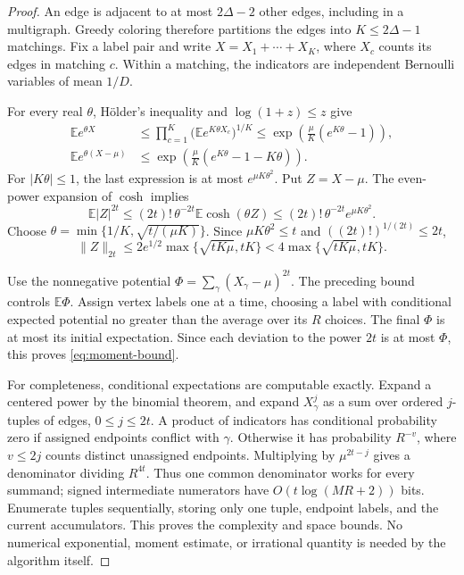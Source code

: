 \documentclass[11pt]{article}
\theoremstyle{remark}\newtheorem{remark}[theorem]{Remark}
\newcommand{\E}{\mathbb E}
\begin{document}
\begin{proof}
An edge is adjacent to at most $2\Delta-2$ other edges, including in a multigraph. Greedy coloring therefore partitions the edges into $K\le2\Delta-1$ matchings. Fix a label pair and write $X=X_1+\cdots+X_K$, where $X_c$ counts its edges in matching $c$. Within a matching, the indicators are independent Bernoulli variables of mean $1/D$.

For every real $\theta$, H\"older's inequality and $\log(1+z)\le z$ give
\begin{align*}
 \E e^{\theta X}
 &\le\prod_{c=1}^K\bigl(\E e^{K\theta X_c}\bigr)^{1/K}
 \le\exp\left(\frac\mu K(e^{K\theta}-1)\right),\\
 \E e^{\theta(X-\mu)}
 &\le\exp\left(\frac\mu K(e^{K\theta}-1-K\theta)\right).
\end{align*}
For $|K\theta|\le1$, the last expression is at most $e^{\mu K\theta^2}$. Put $Z=X-\mu$. The even-power expansion of $\cosh$ implies
\[
 \E |Z|^{2t}
 \le (2t)!\,\theta^{-2t}\E\cosh(\theta Z)
 \le (2t)!\,\theta^{-2t}e^{\mu K\theta^2}.
\]
Choose $\theta=\min\{1/K,\sqrt{t/(\mu K)}\}$. Since $\mu K\theta^2\le t$ and $((2t)!)^{1/(2t)}\le2t$,
\[
 \|Z\|_{2t}
 \le 2e^{1/2}\max\{\sqrt{tK\mu},tK\}
 <4\max\{\sqrt{tK\mu},tK\}.
\]

Use the nonnegative potential $\Phi=\sum_\gamma(X_\gamma-\mu)^{2t}$. The preceding bound controls $\E\Phi$. Assign vertex labels one at a time, choosing a label with conditional expected potential no greater than the average over its $R$ choices. The final $\Phi$ is at most its initial expectation. Since each deviation to the power $2t$ is at most $\Phi$, this proves \eqref{eq:moment-bound}.

For completeness, conditional expectations are computable exactly. Expand a centered power by the binomial theorem, and expand $X_\gamma^j$ as a sum over ordered $j$-tuples of edges, $0\le j\le2t$. A product of indicators has conditional probability zero if assigned endpoints conflict with $\gamma$. Otherwise it has probability $R^{-v}$, where $v\le2j$ counts distinct unassigned endpoints. Multiplying by $\mu^{2t-j}$ gives a denominator dividing $R^{4t}$. Thus one common denominator works for every summand; signed intermediate numerators have $O(t\log(MR+2))$ bits. Enumerate tuples sequentially, storing only one tuple, endpoint labels, and the current accumulators. This proves the complexity and space bounds. No numerical exponential, moment estimate, or irrational quantity is needed by the algorithm itself.
\end{proof}
\end{document}
